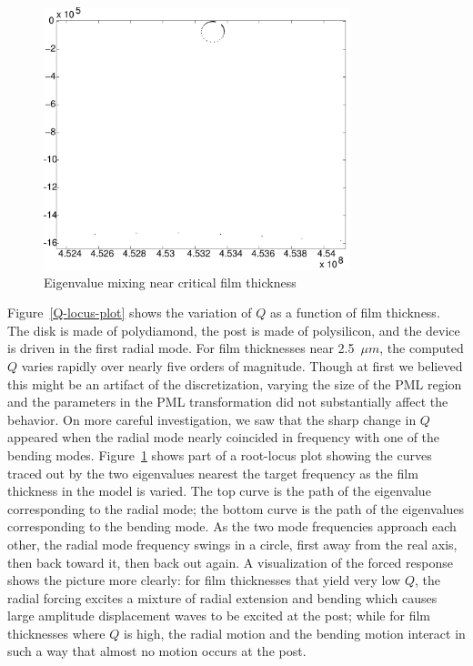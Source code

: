 \documentclass{article}
\newcommand{\um}{\ensuremath{\mu m}}
\begin{document}
\begin{figure}
  \label{root-locus-plot}
  \begin{center}
    \includegraphics[height=3in]{rootlocus4.pdf}
    \caption{Eigenvalue mixing near critical film thickness}
  \end{center}
\end{figure}

Figure~\ref{Q-locus-plot} shows the variation of $Q$ as a function of
film thickness.  The disk is made of polydiamond, the post is made of
polysilicon, and the device is driven in the first radial mode.  For
film thicknesses near 2.5~\um, the computed $Q$ varies rapidly over
nearly five orders of magnitude.  Though at first we believed this
might be an artifact of the discretization, varying the size of the
PML region and the parameters in the PML transformation did not
substantially affect the behavior.  On more careful investigation, we
saw that the sharp change in $Q$ appeared when the radial mode nearly
coincided in frequency with one of the bending modes.
Figure~\ref{root-locus-plot} shows part of a root-locus plot showing
the curves traced out by the two eigenvalues nearest the target
frequency as the film thickness in the model is varied.  The top curve
is the path of the eigenvalue corresponding to the radial mode; the
bottom curve is the path of the eigenvalues corresponding to the
bending mode.  As the two mode frequencies approach each other, the
radial mode frequency swings in a circle, first away from the real
axis, then back toward it, then back out again.  A visualization of
the forced response shows the picture more clearly: for film
thicknesses that yield very low $Q$, the radial forcing excites a
mixture of radial extension and bending which causes large amplitude
displacement waves to be excited at the post; while for film
thicknesses where $Q$ is high, the radial motion and the bending motion
interact in such a way that almost no motion occurs at the post.
\end{document}

